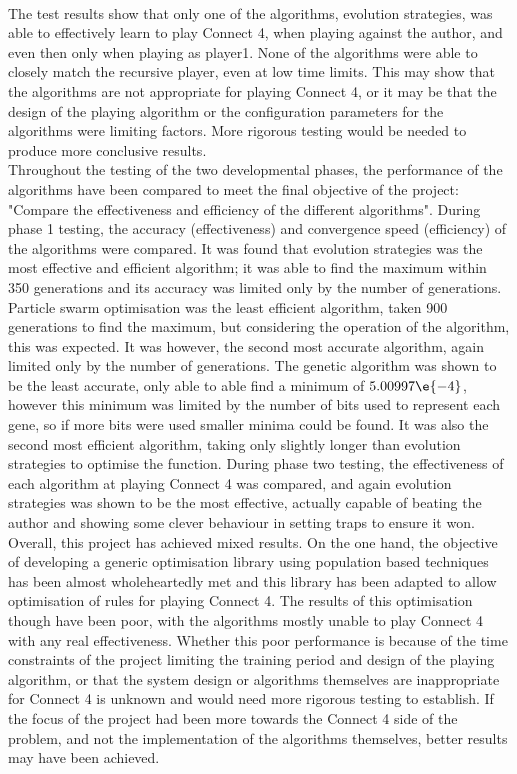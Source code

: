 \\The test results show that only one of the algorithms, evolution strategies, was able to effectively learn to play Connect 4, when playing against the author, and even then only when playing as player1. None of the algorithms were able to closely match the recursive player, even at low time limits. This may show that the algorithms are not appropriate for playing Connect 4, or it may be that the design of the playing algorithm or the configuration parameters for the algorithms were limiting factors. More rigorous testing would be needed to produce more conclusive results.
\\Throughout the testing of the two developmental phases, the performance of the algorithms have been compared to meet the final objective of the project: "Compare the effectiveness and efficiency of the different algorithms". During phase 1 testing, the accuracy (effectiveness) and convergence speed (efficiency) of the algorithms were compared. It was found that evolution strategies was the most effective and efficient algorithm; it was able to find the maximum within 350 generations and its accuracy was limited only by the number of generations. Particle swarm optimisation was the least efficient algorithm, taken 900 generations to find the maximum, but considering the operation of the algorithm, this was expected. It was however, the second most accurate algorithm, again limited only by the number of generations. The genetic algorithm was shown to be the least accurate, only able to able find a minimum of $5.00997\e{-4}$, however this minimum was limited by the number of bits used to represent each gene, so if more bits were used smaller minima could be found. It was also the second most efficient algorithm, taking only slightly longer than evolution strategies to optimise the function. During phase two testing, the effectiveness of each algorithm at playing Connect 4 was compared, and again evolution strategies was shown to be the most effective, actually capable of beating the author and showing some clever behaviour in setting traps to ensure it won.
\\Overall, this project has achieved mixed results. On the one hand, the objective of developing a generic optimisation library using population based techniques has been almost wholeheartedly met and this library has been adapted to allow optimisation of rules for playing Connect 4. The results of this optimisation though have been poor, with the algorithms mostly unable to play Connect 4 with any real effectiveness. Whether this poor performance is because of the time constraints of the project limiting the training period and design of the playing algorithm, or that the system design or algorithms themselves are inappropriate for Connect 4 is unknown and would need more rigorous testing to establish. If the focus of the project had been more towards the Connect 4 side of the problem, and not the implementation of the algorithms themselves, better results may have been achieved.

